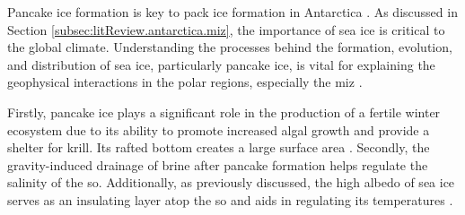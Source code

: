 
Pancake ice formation is key to pack ice formation in Antarctica \cite{Clarke1984,Lange1991}. As discussed in Section \ref{subsec:litReview.antarctica.miz}, the importance of sea ice is critical to the global climate. Understanding the processes behind the formation, evolution, and distribution of sea ice, particularly pancake ice, is vital for explaining the geophysical interactions in the polar regions, especially the \acs{miz} \cite{DeCarolis2002}.

Firstly, pancake ice plays a significant role in the production of a fertile winter ecosystem due to its ability to promote increased algal growth and provide a shelter for krill. Its rafted bottom creates a large surface area \cite{Wadhams2002}. Secondly, the gravity-induced drainage of brine after pancake formation helps regulate the salinity of the \acs{so}. Additionally, as previously discussed, the high albedo of sea ice serves as an insulating layer atop the \acs{so} and aids in regulating its temperatures \cite{Doble2003}.


